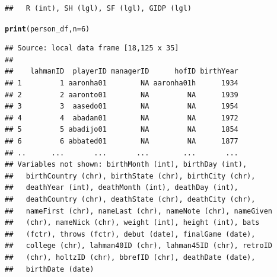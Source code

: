 \documentclass{beamer}\usepackage[]{graphicx}\usepackage[]{color}
\makeatletter
\newcommand{\hlnum}[1]{\textcolor[rgb]{0.686,0.059,0.569}{#1}}%
\newcommand{\hlstd}[1]{\textcolor[rgb]{0.345,0.345,0.345}{#1}}%
\newcommand{\hlkwc}[1]{\textcolor[rgb]{0.333,0.667,0.333}{#1}}%
\newcommand{\hlkwd}[1]{\textcolor[rgb]{0.737,0.353,0.396}{\textbf{#1}}}%
\newenvironment{kframe}{%
 \def\at@end@of@kframe{}%
 \ifinner\ifhmode%
  \def\at@end@of@kframe{\end{minipage}}%
  \begin{minipage}{\columnwidth}%
 \fi\fi%
 \def\FrameCommand##1{\hskip\@totalleftmargin \hskip-\fboxsep
 \colorbox{shadecolor}{##1}\hskip-\fboxsep
     \hskip-\linewidth \hskip-\@totalleftmargin \hskip\columnwidth}%
 \MakeFramed {\advance\hsize-\width
   \@totalleftmargin\z@ \linewidth\hsize
   \@setminipage}}%
 {\par\unskip\endMakeFramed%
 \at@end@of@kframe}
\newenvironment{knitrout}{}{} %
\makeatother
\begin{document}
\begin{frame}
\begin{knitrout}
\begin{kframe}
\begin{verbatim}
##   R (int), SH (lgl), SF (lgl), GIDP (lgl)
\end{verbatim}
\end{kframe}
\end{knitrout}
  \pagebreak
\begin{knitrout}\footnotesize
{}\color{fgcolor}\begin{kframe}
\begin{alltt}
\hlkwd{print}\hlstd{(person_df,}   \hlkwc{n} \hlstd{=} \hlnum{6}\hlstd{)}
\end{alltt}
\begin{verbatim}
## Source: local data frame [18,125 x 35]
## 
##    lahmanID  playerID managerID      hofID birthYear
## 1         1 aaronha01        NA aaronha01h      1934
## 2         2 aaronto01        NA         NA      1939
## 3         3  aasedo01        NA         NA      1954
## 4         4  abadan01        NA         NA      1972
## 5         5 abadijo01        NA         NA      1854
## 6         6 abbated01        NA         NA      1877
## ..      ...       ...       ...        ...       ...
## Variables not shown: birthMonth (int), birthDay (int),
##   birthCountry (chr), birthState (chr), birthCity (chr),
##   deathYear (int), deathMonth (int), deathDay (int),
##   deathCountry (chr), deathState (chr), deathCity (chr),
##   nameFirst (chr), nameLast (chr), nameNote (chr), nameGiven
##   (chr), nameNick (chr), weight (int), height (int), bats
##   (fctr), throws (fctr), debut (date), finalGame (date),
##   college (chr), lahman40ID (chr), lahman45ID (chr), retroID
##   (chr), holtzID (chr), bbrefID (chr), deathDate (date),
##   birthDate (date)
\end{verbatim}
\end{kframe}
\end{knitrout}
\end{frame} 
\end{document}
